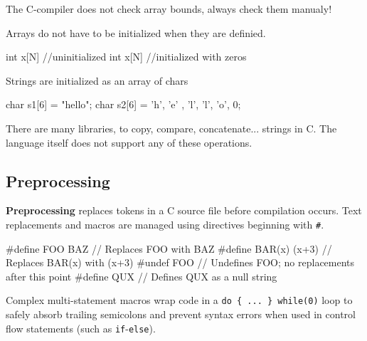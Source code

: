 \begin{important}
    The C-compiler does not check array bounds, always check them manualy!
\end{important}

\begin{remark}
    Arrays do not have to be initialized when they are definied.
\end{remark}

\begin{codeexample}
int x[N] //uninitialized
int x[N] {} //initialized with zeros
\end{codeexample}

\begin{remark}
    Strings are initialized as an array of chars
\end{remark}

\begin{codeexample}
char s1[6] = "hello";
char s2[6] = {'h', 'e' , 'l', 'l', 'o', 0};
\end{codeexample}

\begin{remark}
    There are many libraries, to copy, compare, concatenate... strings in C. The language itself does not support any of these operations.
\end{remark}

\subsection{Preprocessing}
\begin{definition}
    \textbf{Preprocessing} replaces tokens in a C source file before compilation occurs. Text replacements and macros are managed using directives beginning with \texttt{\#}.
\end{definition}

\begin{codeexample}
#define FOO BAZ       // Replaces FOO with BAZ
#define BAR(x) (x+3)  // Replaces BAR(x) with (x+3)
#undef FOO            // Undefines FOO; no replacements after this point
#define QUX           // Defines QUX as a null string
\end{codeexample}

\begin{remark}
    Complex multi-statement macros wrap code in a \texttt{do \{ ... \} while(0)} loop to safely absorb trailing semicolons and prevent syntax errors when used in control flow statements (such as \texttt{if}-\texttt{else}).
\end{remark}

